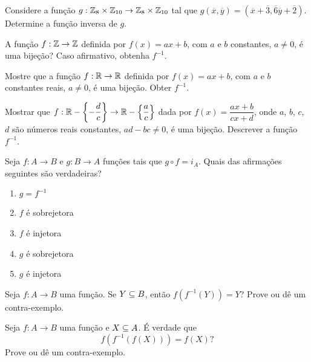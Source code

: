 \documentclass[12pt]{exam}
\begin{document}
\vspace{.3cm}

\questao{} Considere a fun{\c c}{\~a}o $g : \mathbb{Z}_8 \times \mathbb{Z}_{10} \to \mathbb{Z}_8 \times \mathbb{Z}_{10}$ tal que $g(\overline{x},\overline{y}) = (\overline{x} + \overline{3}, \overline{6}\overline{y} + \overline{2})$. Determine a fun\c{c}\~ao inversa de $g$.

\vspace{.3cm}

\questao{} A fun{\c c}{\~a}o $f : \mathbb{Z} \to \mathbb{Z}$ definida por $f(x) = ax + b$, com $a$ e $b$ constantes, $a \ne 0$, {\'e} uma bije{\c c}{\~a}o? Caso afirmativo, obtenha $f^{-1}$.

\vspace{.3cm}


\questao{} Mostre que a fun{\c c}{\~a}o $f : \mathbb{R} \to \mathbb{R}$ definida por $f(x) = ax + b$, com $a$ e $b$ constantes reais, $a \ne 0$, {\'e} uma bije{\c c}{\~a}o. Obter $f^{-1}$.

\vspace{.3cm}

\questao{} Mostrar que $f : \mathbb{R} - \left\{-\dfrac{d}{c}\right\} \to \mathbb{R}  - \left\{\dfrac{a}{c}\right\}$ dada por $f(x) =  \dfrac{ax + b}{cx + d}$, onde $a$, $b$, $c$, $d$ s{\~a}o n{\'u}meros reais constantes, $ad - bc \ne 0$, {\'e} uma bije{\c c}{\~a}o. Descrever a fun{\c c}{\~a}o $f^{-1}$.

\vspace{.3cm}

\questao{} Seja $f : A \to B$ e $g : B \to A$ fun\c{c}\~oes tais que $g \circ f = i_A$. Quais das afirma\c{c}\~oes seguintes s\~ao verdadeiras?
\begin{enumerate}[label={\alph*})]
    \item $g = f^{-1}$
    \item $f$ \'e sobrejetora
    \item $f$ \'e injetora
    \item $g$ \'e sobrejetora
    \item $g$ \'e injetora
\end{enumerate}

\vspace{.3cm}

\questao{} Seja $f : A \to B$ uma função. Se $Y \subseteq B$, então $f(f^{-1}(Y)) = Y$? Prove ou dê um contra-exemplo.

\vspace{.3cm}

\questao{} Seja $f : A \to B$ uma função e $X \subseteq A$. É verdade que
\[
    f(f^{-1}(f(X))) = f(X)?
\]
Prove ou dê um contra-exemplo.
\end{document}
